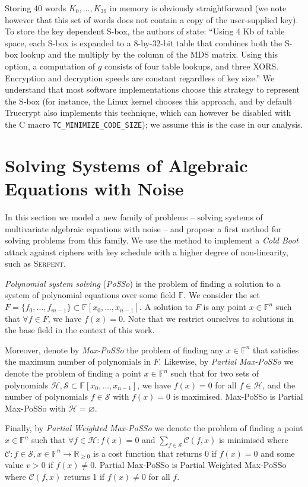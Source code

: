 \documentclass{llncs}
\newcommand{\Ss}{\ensuremath{\mathcal{S}}}
\newcommand{\Hs}{\ensuremath{\mathcal{H}}}
\newcommand{\Serpent}{\textsc{Serpent}\xspace}
\newcommand{\coldboot}{\emph{Cold Boot}\xspace}
\newcommand{\field}[1]{\mathbb{#1}}
\newcommand{\F}{\field{F}}
\begin{document}
Storing 40 words $K_0,\dots,K_{39}$ in memory is obviously straightforward (we note however that this set of words does not contain a copy of the user-supplied key).
To store the key dependent S-box, the authors of \cite{twofish} state: ``Using 4 Kb of table space, each S-box is expanded to a 8-by-32-bit table that combines both the S-box lookup and the multiply by the column of the MDS matrix. Using this option, a computation of $g$ consists of four table lookups, and three
XORS. Encryption and decryption speeds are constant regardless of key size.'' We understand that most software implementations choose this strategy to represent the S-box (for instance, the Linux kernel chooses this approach, and by default Truecrypt also implements this technique, which can however be disabled with the C macro \verb|TC_MINIMIZE_CODE_SIZE|); we assume this is the case in our analysis.


\section{Solving Systems of Algebraic Equations with Noise}
\label{sec:algebra}

In this section we model a new family of problems -- solving systems of multivariate algebraic equations with noise -- and propose a first method for solving problems from this family. We use the method to implement a \coldboot attack against ciphers with key schedule with a higher degree of non-linearity, such as \Serpent.

\emph{Polynomial system solving} (\emph{PoSSo}) is the problem of finding a solution to a system of polynomial equations over some field $\field{F}$. We consider the set $F = \{f_0,\dots,f_{m-1}\} \subset \F[x_0,\dots,x_{n-1}]$. A solution to $F$ is any point $x \in \field{F}^n$ such that $\forall f \in F$, we have $f(x) = 0$. Note that we restrict ourselves to solutions in the base field in the context of this work.

Moreover, denote by \emph{Max-PoSSo} the problem of finding any $x \in \field{F}^n$ that satisfies the maximum number of polynomials in $F$. 
Likewise, by \emph{Partial Max-PoSSo} we denote the problem of finding a point $x \in \field{F}^n$ such that for two sets of polynomials $\Hs, \Ss \subset \F[x_0, \dots, x_{n-1}]$, we have $f(x) = 0$ for all $f \in \Hs$, and the number of polynomials $f \in \Ss$ with $f(x) = 0$ is maximised. Max-PoSSo is Partial Max-PoSSo with $\Hs = \varnothing$.

Finally, by \emph{Partial Weighted Max-PoSSo} we denote the problem of finding a point $x \in \field{F}^n$ such that $\forall f \in \Hs: f(x) = 0$ and $\sum_{f \in \Ss} \mathcal{C}(f,x)$ is minimised where $\mathcal{C}: f \in \Ss,x \in \field{F}^n \rightarrow \field{R}_{\geq 0}$ is a cost function that returns $0$ if $f(x) = 0$ and some value $v> 0$ if $f(x) \neq 0$. Partial Max-PoSSo is Partial Weighted Max-PoSSo where $\mathcal{C}(f,x)$ returns 1 if $f(x) \neq 0$ for all $f$.
\end{document}
